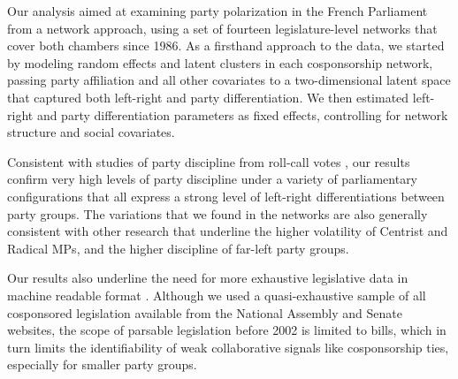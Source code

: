 
Our analysis aimed at examining party polarization in the French Parliament from a network approach, using a set of fourteen legislature-level networks that cover both chambers since 1986. As a firsthand approach to the data, we started by modeling random effects and latent clusters in each cosponsorship network, passing party affiliation and all other covariates to a two-dimensional latent space that captured both left-right and party differentiation.%
  We then estimated left-right and party differentiation parameters as fixed effects, controlling for network structure and social covariates.%

Consistent with studies of party discipline from roll-call votes \citep{GodboutFoucault2013-FP}, our results confirm very high levels of party discipline under a variety of parliamentary configurations that all express a strong level of left-right differentiations between party groups. The variations that we found in the networks are also generally consistent with other research that underline the higher volatility of Centrist and Radical MPs, and the higher discipline of far-left party groups.%

Our results also underline the need for more exhaustive legislative data in machine readable format \citep[p.~82]{Sauger2010}. Although we used a quasi-exhaustive sample of all cosponsored legislation available from the National Assembly and Senate websites, the scope of parsable legislation before 2002 is limited to bills, which in turn limits the identifiability of weak collaborative signals like cosponsorship ties, especially for smaller party groups.%
